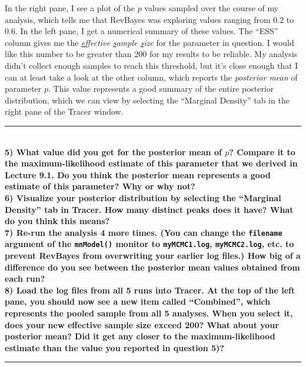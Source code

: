 \documentclass[12pt]{article}
\begin{document}
\noindent In the right pane, I see a plot of the $p$ values sampled over the course of my analysis, which tells me that RevBayes was exploring values ranging from 0.2 to 0.6. In the left pane, I get a numerical summary of these values. The ``ESS'' column gives me the \textit{\ul{e}ffective \ul{s}ample \ul{s}ize} for the parameter in question. I would like this number to be greater than 200 for my results to be reliable. My analysis didn't collect enough samples to reach this threshold, but it's close enough that I can at least take a look at the other column, which reports the \textit{posterior mean} of parameter $p$. This value represents a good summary of the entire posterior distribution, which we can view by selecting the ``Marginal Density'' tab in the right pane of the Tracer window. \\

\hrule
\ \\[1ex]
\textbf{5) What value did you get for the posterior mean of $p$? Compare it to the maximum-likelihood estimate of this parameter that we derived in Lecture 9.1. Do you think the posterior mean represents a good estimate of this parameter? Why or why not?} \\

\noindent \textbf{6) Visualize your posterior distribution by selecting the ``Marginal Density'' tab in Tracer. How many distinct peaks does it have? What do you think this means?} \\

\noindent \textbf{7) Re-run the analysis 4 more times. (You can change the \texttt{filename} argument of the \texttt{mnModel()} monitor to \texttt{myMCMC1.log}, \texttt{myMCMC2.log}, etc. to prevent RevBayes from overwriting your earlier log files.) How big of a difference do you see between the posterior mean values obtained from each run?} \\

\noindent \textbf{8) Load the log files from all 5 runs into Tracer. At the top of the left pane, you should now see a new item called ``Combined'', which represents the pooled sample from all 5 analyses. When you select it, does your new effective sample size exceed 200? What about your posterior mean? Did it get any closer to the maximum-likelihood estimate than the value you reported in question 5)?} \\
\hrule
\end{document}
